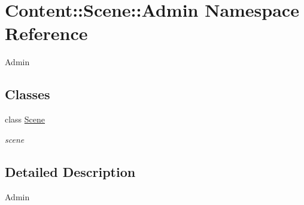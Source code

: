 \hypertarget{namespaceContent_1_1Scene_1_1Admin}{
\section{Content::Scene::Admin Namespace Reference}
\label{namespaceContent_1_1Scene_1_1Admin}
}


Admin  
\subsection*{Classes}
\begin{DoxyCompactItemize}
\item 
class \hyperlink{classContent_1_1Scene_1_1Admin_1_1Scene}{Scene}
\begin{DoxyCompactList}\small\item\em scene \item\end{DoxyCompactList}\end{DoxyCompactItemize}


\subsection{Detailed Description}
Admin 